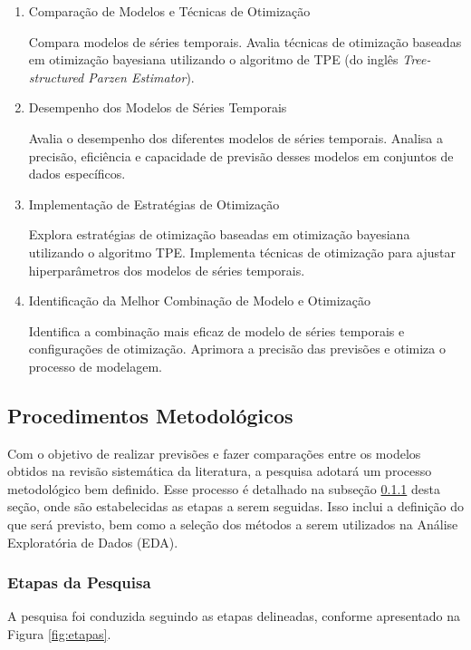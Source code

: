 \begin{enumerate}
	\item Comparação de Modelos e Técnicas de Otimização
	
	Compara modelos de séries temporais.
	Avalia técnicas de otimização baseadas em otimização bayesiana utilizando o algoritmo de TPE (do inglês  \textit{Tree-structured Parzen Estimator}).
	
	\item  Desempenho dos Modelos de Séries Temporais
	
	Avalia o desempenho dos diferentes modelos de séries temporais.
	Analisa a precisão, eficiência e capacidade de previsão desses modelos em conjuntos de dados específicos.
	
	\item  Implementação de Estratégias de Otimização
	
	Explora estratégias de otimização baseadas em otimização bayesiana utilizando o algoritmo TPE.
	Implementa técnicas de otimização para ajustar hiperparâmetros dos modelos de séries temporais.
	
	\item Identificação da Melhor Combinação de Modelo e Otimização
	
	Identifica a combinação mais eficaz de modelo de séries temporais e configurações de otimização.
	Aprimora a precisão das previsões e otimiza o processo de modelagem.
\end{enumerate}

\subsection{Procedimentos Metodol{\'o}gicos} \label{subsec:metod}

Com o objetivo de realizar previsões e fazer comparações entre os modelos obtidos na revisão sistemática da literatura, a pesquisa adotará um processo metodológico bem definido. Esse processo é detalhado na subseção \ref{subsubsec:etp} desta seção, onde são estabelecidas as etapas a serem seguidas. Isso inclui a definição do que será previsto, bem como a seleção dos métodos a serem utilizados na Análise Exploratória de Dados (EDA).


\subsubsection{Etapas da Pesquisa}\label{subsubsec:etp}


A pesquisa foi conduzida seguindo as etapas delineadas, conforme apresentado na Figura \ref{fig:etapas}.

